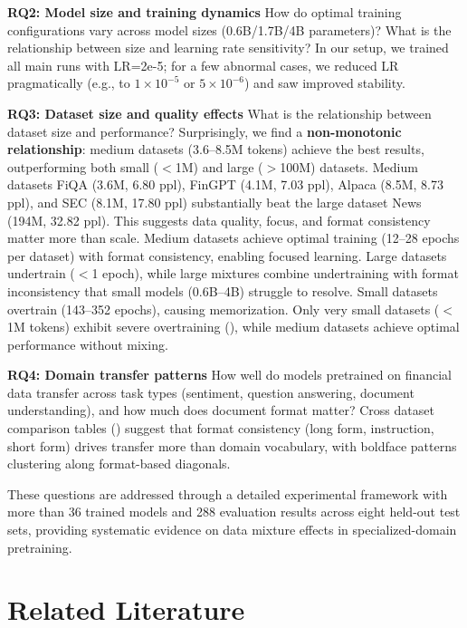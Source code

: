 \textbf{RQ2: Model size and training dynamics}
How do optimal training configurations vary across model sizes (0.6B/1.7B/4B parameters)? What is the relationship between size and learning rate sensitivity? In our setup, we trained all main runs with LR=2e-5; for a few abnormal cases, we reduced LR pragmatically (e.g., to $1\times10^{-5}$ or $5\times10^{-6}$) and saw improved stability.

\textbf{RQ3: Dataset size and quality effects}
What is the relationship between dataset size and performance? Surprisingly, we find a \textbf{non-monotonic relationship}: medium datasets (3.6–8.5M tokens) achieve the best results, outperforming both small ($<$1M) and large ($>$100M) datasets. Medium datasets FiQA (3.6M, 6.80 ppl), FinGPT (4.1M, 7.03 ppl), Alpaca (8.5M, 8.73 ppl), and SEC (8.1M, 17.80 ppl) substantially beat the large dataset News (194M, 32.82 ppl). This suggests data quality, focus, and format consistency matter more than scale. Medium datasets achieve optimal training (12–28 epochs per dataset) with format consistency, enabling focused learning. Large datasets undertrain ($<$1 epoch), while large mixtures combine undertraining with format inconsistency that small models (0.6B–4B) struggle to resolve. Small datasets overtrain (143–352 epochs), causing memorization. Only very small datasets ($<$1M tokens) exhibit severe overtraining (), while medium datasets achieve optimal performance without mixing.

\textbf{RQ4: Domain transfer patterns}
How well do models pretrained on financial data transfer across task types (sentiment, question answering, document understanding), and how much does document format matter? Cross dataset comparison tables () suggest that format consistency (long form, instruction, short form) drives transfer more than domain vocabulary, with boldface patterns clustering along format-based diagonals.

These questions are addressed through a detailed experimental framework with more than 36 trained models and 288 evaluation results across eight held-out test sets, providing systematic evidence on data mixture effects in specialized-domain pretraining.

\section{Related Literature}

